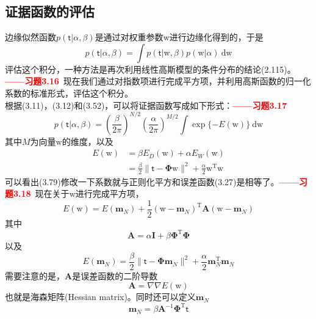 \documentclass[b5paper]{book}
\numberwithin{equation}{chapter}
\newcommand {\bw} {\boldsymbol{\mathrm{w}}}
\newcommand {\sft} {\boldsymbol{\mathsf{t}}}
\newcommand {\rmT} {\mathrm{T}}
\newcommand {\rmd} {\mathrm{d}}
\newcommand {\bfPhi} {\boldsymbol{\Phi}}
\begin{document}
	\subsection{证据函数的评估}
	\textnormal{
	边缘似然函数$p(\sft|\alpha,\beta)$是通过对权重参数$\bw$进行边缘化得到的，于是
	\begin{equation}
		p(\sft|\alpha,\beta)=\int p(\sft|\bw, \beta)p(\bw|\alpha)\ \rmd \bw
	\end{equation}
	评估这个积分，一种方法是再次利用线性高斯模型的条件分布的结论(2.115)。\textcolor{red}{\textbf{——习题3.16}}\ 现在我们通过对指数项进行完成平方项，并利用高斯函数的归一化系数的标准形式，评估这个积分。\\
	\indent 根据(3.11)，(3.12)和(3.52)，可以将证据函数写成如下形式：\textcolor{red}{\textbf{——习题3.17}}
	\begin{equation}
		p(\sft|\alpha,\beta) = \left(\frac{\beta}{2\pi}\right)^{N/2} \left(\frac{\alpha}{2\pi}\right)^{M/2} \int \exp\{-E(\bw)\}\ \rmd \bw
	\end{equation}
	其中$M$为向量$\bw$的维度，以及
	\begin{equation}
	\begin{split}
		E(\bw) &= \beta E_D(\bw) + \alpha E_W(\bw) \\
		&= \frac{\beta}{2}\|\sft - \bfPhi \bw \|^2 + \frac{\alpha}{2}\bw^{\rmT} \bw
	\end{split}
	\end{equation}
	可以看出(3.79)修改一下系数就与正则化平方和误差函数(3.27)是相等了。\textcolor{red}{\textbf{——习题3.18}}\ 现在关于$\bw$进行完成平方项，
	\begin{equation}
		E(\bw) = E(\mathbf{m}_N) + \frac{1}{2}(\bw - \mathbf{m}_N)^{\rmT} \mathbf{A} (\bw - \mathbf{m}_N)
	\end{equation}
	其中
	\begin{equation}
		\mathbf{A}=\alpha \mathbf{I} + \beta \bfPhi^{\rmT} \bfPhi
	\end{equation}
	以及
	\begin{equation}
		E(\mathbf{m}_N) = \frac{\beta}{2}\|\sft - \bfPhi\mathbf{m}_N\|^2 + \frac{\alpha}{2}\mathbf{m}_N^{\rmT}\mathbf{m}_N
	\end{equation}
	需要注意的是，$\mathbf{A}$是误差函数的二阶导数
	\begin{equation}
		\mathbf{A}=\nabla \nabla E(\bw)
	\end{equation}
	也就是海森矩阵(Hessian matrix)。同时还可以定义$\mathbf{m}_N$
	\begin{equation}
		\mathbf{m}_N = \beta \mathbf{A}^{-1}\bfPhi^{\rmT} \sft

\end{equation}}
\end{document}
